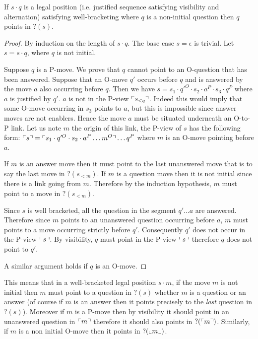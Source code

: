 \begin{lem}
  If $s\cdot q$ is a legal position (i.e. justified sequence satisfying visibility and alternation) satisfying
    well-bracketing where $q$ is a non-initial question then $q$ points in $?(s)$.
\end{lem}
\begin{proof}
    By induction on the length of $s \cdot q$. The base case $s=\epsilon$ is trivial.
    Let $s = s\cdot q$, where $q$ is not initial.

    Suppose $q$ is a P-move. We prove that $q$ cannot point to an O-question that has been answered.
    Suppose that an O-move $q'$ occurs before $q$ and is answered by the move $a$ also occurring before $q$.
    Then we have $s = s_1 \cdot q'^O \cdot s_2 \cdot a^P \cdot s_3 \cdot q^P$ where $a$ is justified by $q'$.
    $a$ is not in the P-view $\ulcorner s_{<q} \urcorner$. Indeed this would imply that some O-move occurring in $s_3$ points to $a$, but this is impossible
    since answer moves are not enablers. Hence the move $a$ must be situated underneath an O-to-P link. Let us note $m$ the origin of this link,
    the P-view of $s$ has the following form: $\ulcorner s \urcorner = \ulcorner s_1\cdot q'^O \cdot s_2 \cdot a^P \ldots m^O \urcorner \ldots q^P$ where $m$ is an O-move pointing before $a$.

    If $m$ is an answer move then it must point to the last unanswered move that is to say the last move in $?(s_{<m})$.
    If $m$ is a question move then it is not initial since there is a link going from $m$. Therefore by the induction hypothesis, $m$ must point
    to a move in $?(s_{<m})$.

    Since $s$ is well bracketed, all the question in the segment $q'\ldots a$ are answered.
    Therefore since $m$ points to an unanswered question occurring before $a$, $m$ must
    points to a move occurring strictly before $q'$. Consequently $q'$ does not occur in the P-view $\ulcorner s \urcorner$.
    By visibility, $q$ must point in the P-view $\ulcorner s \urcorner$ therefore $q$ does not point to $q'$.

    A similar argument holds if $q$ is an O-move.
\end{proof}

This means that in a well-bracketed legal position $s\cdot m$, if the move $m$ is not initial then $m$ must point to a question in $?(s)$
whether $m$ is a question or an answer (of course if $m$ is an answer then it points precisely to the \emph{last} question in $?(s)$).
Moreover if $m$ is a P-move then by visibility it should point in an unanswered question in $\ulcorner m \urcorner$ therefore
it should also points in $?(\ulcorner m \urcorner)$.
Similarly, if $m$ is a non initial O-move then it points in $?(\llcorner m \lrcorner)$.

